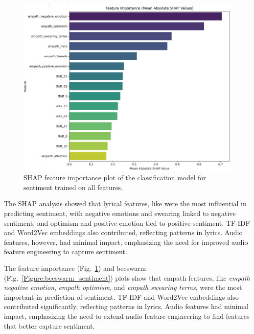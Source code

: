 \begin{center}
\begin{figure}[H]
  \centering
  \includegraphics[width=6in]{img/feature_importance_sentiment.png}
  \caption{SHAP feature importance plot of the classification model for
  sentiment trained on all features.}
  \label{Figure:feature_importance_sentiment}
\end{figure}
\end{center}

The SHAP analysis showed that lyrical features,
like were the most influential in predicting sentiment, with negative emotions
and swearing linked to negative sentiment, and optimism and positive emotion
tied to positive sentiment. TF-IDF and Word2Vec embeddings also contributed,
reflecting patterns in lyrics. Audio features, however, had minimal impact,
emphasizing the need for improved audio feature engineering to capture
sentiment.

The feature importance (Fig.~\ref{Figure:feature_importance_sentiment}) and
beeswarm (Fig.~\ref{Figure:beeswarm_sentiment}) plots show that empath
features, like \textit{empath negative emotion}, \textit{empath optimism}, and
\textit{empath swearing terms}, were the most important in prediction of
sentiment. TF-IDF and Word2Vec embeddings also contributed significantly,
reflecting patterns in lyrics. Audio features had minimal impact, emphasizing
the need to extend audio feature engineering to find features that better
capture sentiment.

